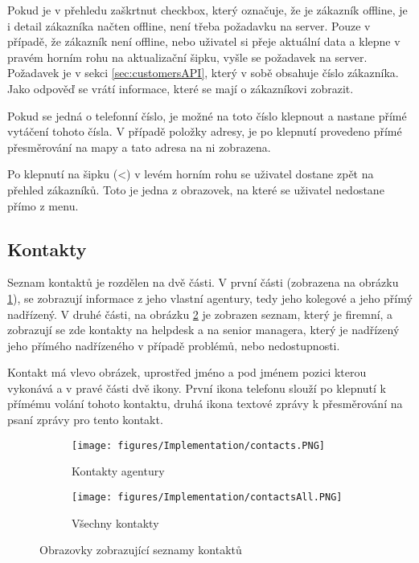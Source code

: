 \documentclass[11pt,twoside,a4paper]{book}
\begin{document}
Pokud je v přehledu zaškrtnut checkbox, který označuje, že je zákazník offline, je i detail zákazníka načten offline, není třeba požadavku na server. Pouze v případě, že zákazník není offline, nebo uživatel si přeje aktuální data a klepne v pravém horním rohu na aktualizační šipku, vyšle se požadavek na server. Požadavek je v sekci \ref{sec:customersAPI}, který v sobě obsahuje číslo zákazníka. Jako odpověď se vrátí informace, které se mají o zákazníkovi zobrazit. 

Pokud se jedná o telefonní číslo, je možné na toto číslo klepnout a nastane přímé vytáčení tohoto čísla. V případě položky adresy, je po klepnutí provedeno přímé přesměrování na mapy a tato adresa na ni zobrazena.

Po klepnutí na šipku (<) v levém horním rohu se uživatel dostane zpět na přehled zákazníků. Toto je jedna z obrazovek, na které se uživatel nedostane přímo z menu.

\subsection{Kontakty}
Seznam kontaktů je rozdělen na dvě části. V první části (zobrazena na obrázku \ref{fig:contactscreensImplementa}), se zobrazují informace z jeho vlastní agentury, tedy jeho kolegové a jeho přímý nadřízený. V druhé části, na obrázku \ref{fig:scontactscreensImplementb} je zobrazen seznam, který je firemní, a zobrazují se zde kontakty na helpdesk a na senior managera, který je nadřízený jeho přímého nadřízeného v případě problémů, nebo nedostupnosti.

Kontakt má vlevo obrázek, uprostřed jméno a pod jménem pozici kterou vykonává a v pravé části dvě ikony. První ikona telefonu slouží po klepnutí k přímému volání tohoto kontaktu, druhá ikona textové zprávy k přesměrování na psaní zprávy pro tento kontakt.

\begin{figure}[H]
	\centering
	\begin{subfigure}{.4\textwidth}
	  	\centering
	  	\texttt{[image: figures/Implementation/contacts.PNG]}
	  	\caption{Kontakty agentury}
	  	\label{fig:contactscreensImplementa}
	\end{subfigure}
	\begin{subfigure}{.4\textwidth}
	  	\centering
		\texttt{[image: figures/Implementation/contactsAll.PNG]}
	  	\caption{Všechny kontakty}
	  	\label{fig:scontactscreensImplementb}
	\end{subfigure}
\caption{Obrazovky zobrazující seznamy kontaktů}
\label{fig:contactscreensImplement}
\end{figure}
\end{document}
